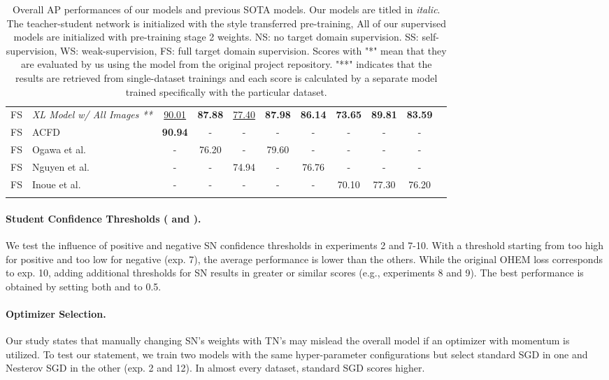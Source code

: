 \documentclass{article}
\begin{document}
\begin{table*}
\begin{tabular}{cl|ccc|cccccc}
    \noalign{\smallskip}
    \hline
    \noalign{\smallskip}

    FS & \textit{XL Model w/ All Images **} 
    & \underline{90.01}
    & \textbf{87.88}
    & \underline{77.40}
    & \textbf{87.98}
    & \textbf{86.14}
    & \textbf{73.65}
    & \textbf{89.81}
    & \textbf{83.59} \\ 
    
    \noalign{\smallskip}
    \hline
    \noalign{\smallskip}
    FS & ACFD \cite{zhang2020acfd} & \textbf{90.94} & - & - & - & - & - & - & - \\
    FS & Ogawa et al. \cite{ogawa2018object} & - & 76.20 & - & 79.60 & - & - & - & - \\
    FS & Nguyen et al. \cite{jimaging4070089} & - & - & 74.94 & - & 76.76  & - & - & - \\
    FS & Inoue et al. \cite{inoue2018crossdomain} & - & - & - & - & - & 70.10 & 77.30 & 76.20 \\
    \noalign{\smallskip}
    \hline
\end{tabular}
\caption{Overall AP performances of our models and previous SOTA models. Our models are titled in \textit{italic}. The teacher-student network is initialized with the style transferred pre-training, All of our supervised models are initialized with pre-training stage 2 weights. NS: no target domain supervision. SS: self-supervision, WS: weak-supervision, FS: full target domain supervision. Scores with "*" mean that they are evaluated by us using the model from the original project repository. "**" indicates that the results are retrieved from single-dataset trainings and each score is calculated by a separate model trained specifically with the particular dataset.}
\label{table:models_perf}
\end{table*} 
\paragraph{Student Confidence Thresholds ( and ).}{We test the influence of positive and negative SN confidence thresholds in experiments 2 and 7-10. With a threshold starting from too high for positive and too low for negative (exp. 7), the average performance is lower than the others. While the original OHEM loss corresponds to exp. 10, adding additional thresholds for SN results in greater or similar scores (e.g., experiments 8 and 9). The best performance is obtained by setting both  and  to 0.5.}

\paragraph{Optimizer Selection.}{Our study states that manually changing SN's weights with TN's may mislead the overall model if an optimizer with momentum is utilized. To test our statement, we train two models with the same hyper-parameter configurations but select standard SGD in one and Nesterov SGD in the other (exp. 2 and 12). In almost every dataset, standard SGD scores  higher.}
\end{document}
